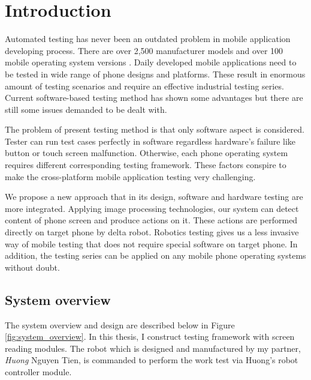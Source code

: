 \makeatletter
\def\maxwidth#1{\ifdim\Gin@nat@width>#1 #1\else\Gin@nat@width\fi}
\makeatother

\chapter{Introduction}

Automated testing has never been an outdated problem in mobile application developing process. There are over 2,500 manufacturer models and over 100 mobile operating system versions \cite{crittercism}. Daily developed mobile applications need to be tested in wide range of phone designs and platforms. These result in enormous amount of testing scenarios and require an effective industrial testing series. Current software-based testing method has shown some advantages but there are still some issues demanded to be dealt with.

The problem of present testing method is that only software aspect is considered. Tester can run test cases perfectly in software regardless hardware's failure like button or touch screen malfunction. Otherwise, each phone operating system requires different corresponding testing framework. These factors conspire to make the cross-platform mobile application testing very challenging. \nocite{weinman_thesis}

We propose a new approach that in its design, software and hardware testing are more integrated. Applying image processing technologies, our system can detect content of phone screen and produce actions on it. These actions are performed directly on target phone by delta robot. Robotics testing gives us a less invasive way of mobile testing that does not require special software on target phone. In addition, the testing series can be applied on any mobile phone operating systems without doubt.

\section{System overview}
The system overview and design are described below in Figure \ref{fig:system_overview}.
In this thesis, I construct testing framework with screen reading modules. The robot which is designed and manufactured by my partner, \textit{Huong} Nguyen Tien, is commanded to perform the work test via Huong's robot controller module.


